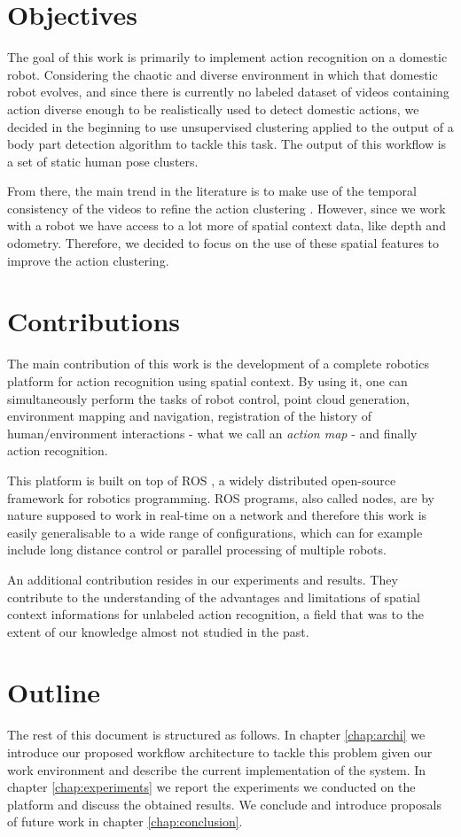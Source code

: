 \section{Objectives}
The goal of this work is primarily to implement action recognition on a domestic robot. Considering the chaotic and diverse environment in which that domestic robot evolves, and since there is currently no labeled dataset of videos containing action diverse enough to be realistically used to detect domestic actions, we decided in the beginning to use unsupervised clustering applied to the output of a body part detection algorithm to tackle this task. The output of this workflow is a set of static human pose clusters. 

From there, the main trend in the literature is to make use of the temporal consistency of the videos to refine the action clustering \cite{unsup_time_seq_action_recognition, action_matching}. However, since we work with a robot we have access to a lot more of spatial context data, like depth and odometry. Therefore, we decided to focus on the use of these spatial features to improve the action clustering.

\section{Contributions}
The main contribution of this work is the development of a complete robotics platform for action recognition using spatial context. By using it, one can simultaneously perform the tasks of robot control, point cloud generation, environment mapping and navigation, registration of the history of human/environment interactions - what we call an \emph{action map} - and finally action recognition.

This platform is built on top of ROS \cite{ROS}, a widely distributed open-source framework for robotics programming. ROS programs, also called nodes, are by nature supposed to work in real-time on a network and therefore this work is easily generalisable to a wide range of configurations, which can for example include long distance control or parallel processing of multiple robots.

An additional contribution resides in our experiments and results. They contribute to the understanding of the advantages and limitations of spatial context informations for unlabeled action recognition, a field that was to the extent of our knowledge almost not studied in the past. 

\section{Outline}
The rest of this document is structured as follows. In chapter \ref{chap:archi} we introduce our proposed workflow architecture to tackle this problem given our work environment and describe the current implementation of the system. In chapter \ref{chap:experiments} we report the experiments we conducted on the platform and discuss the obtained results. We conclude and introduce proposals of future work in chapter \ref{chap:conclusion}. 